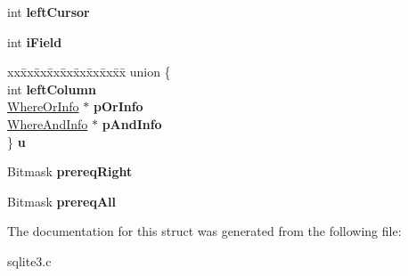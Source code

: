 \begin{DoxyCompactItemize}
\item 
int {\bfseries left\+Cursor}\hypertarget{structWhereTerm_a82bb97ef4285d75b1b9c4fcd2025aaf7}{}\label{structWhereTerm_a82bb97ef4285d75b1b9c4fcd2025aaf7}

\item 
int {\bfseries i\+Field}\hypertarget{structWhereTerm_a39a20cab7599056102a325d8f1f2c0d9}{}\label{structWhereTerm_a39a20cab7599056102a325d8f1f2c0d9}

\item 
\begin{tabbing}
xx\=xx\=xx\=xx\=xx\=xx\=xx\=xx\=xx\=\kill
union \{\\
\>int {\bfseries leftColumn}\\
\>\hyperlink{structWhereOrInfo}{WhereOrInfo} $\ast$ {\bfseries pOrInfo}\\
\>\hyperlink{structWhereAndInfo}{WhereAndInfo} $\ast$ {\bfseries pAndInfo}\\
\} {\bfseries u}\hypertarget{structWhereTerm_a4bbde9b3e4aaa3ed49772b8f11b02250}{}\label{structWhereTerm_a4bbde9b3e4aaa3ed49772b8f11b02250}
\\

\end{tabbing}\item 
Bitmask {\bfseries prereq\+Right}\hypertarget{structWhereTerm_a1274011fa1ef0639284b7944f4570e67}{}\label{structWhereTerm_a1274011fa1ef0639284b7944f4570e67}

\item 
Bitmask {\bfseries prereq\+All}\hypertarget{structWhereTerm_a49b700336b005067352366cfc40de07f}{}\label{structWhereTerm_a49b700336b005067352366cfc40de07f}

\end{DoxyCompactItemize}


The documentation for this struct was generated from the following file\+:\begin{DoxyCompactItemize}
\item 
sqlite3.\+c\end{DoxyCompactItemize}
